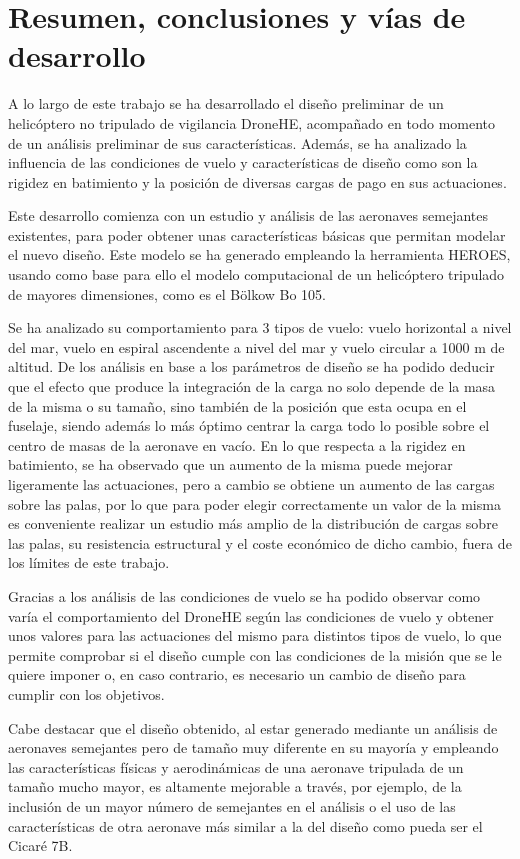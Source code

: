\chapter{Resumen, conclusiones y vías de desarrollo}

A lo largo de este trabajo se ha desarrollado el diseño preliminar de un helicóptero no tripulado de vigilancia DroneHE, acompañado en todo momento de un análisis preliminar de sus características. Además, se ha analizado la influencia de las condiciones de vuelo y características de diseño como son la rigidez en batimiento y la posición de diversas cargas de pago en sus actuaciones.

Este desarrollo comienza con un estudio y análisis de las aeronaves semejantes existentes, para poder obtener unas características básicas que permitan modelar el nuevo diseño. Este modelo se ha generado empleando la herramienta HEROES, usando como base para ello el modelo computacional de un helicóptero tripulado de mayores dimensiones, como es el Bölkow Bo 105.

Se ha analizado su comportamiento para 3 tipos de vuelo: vuelo horizontal a nivel del mar, vuelo en espiral ascendente a nivel del mar y vuelo circular a 1000 m de altitud. De los análisis en base a los parámetros de diseño se ha podido deducir que el efecto que produce la integración de la carga no solo depende de la masa de la misma o su tamaño, sino también de la posición que esta ocupa en el fuselaje, siendo además lo más óptimo centrar la carga todo lo posible sobre el centro de masas de la aeronave en vacío. En lo que respecta a la rigidez en batimiento, se ha observado que un aumento de la misma puede mejorar ligeramente las actuaciones, pero a cambio se obtiene un aumento de las cargas sobre las palas, por lo que para poder elegir correctamente un valor de la misma es conveniente realizar un estudio más amplio de la distribución de cargas sobre las palas, su resistencia estructural y el coste económico de dicho cambio, fuera de los límites de este trabajo.

Gracias a los análisis de las condiciones de vuelo se ha podido observar como varía el comportamiento del DroneHE según las condiciones de vuelo y obtener unos valores para las actuaciones del mismo para distintos tipos de vuelo, lo que permite comprobar si el diseño cumple con las condiciones de la misión que se le quiere imponer o, en caso contrario, es necesario un cambio de diseño para cumplir con los objetivos.

Cabe destacar que el diseño obtenido, al estar generado mediante un análisis de aeronaves semejantes pero de tamaño muy diferente en su mayoría y empleando las características físicas y aerodinámicas de una aeronave tripulada de un tamaño mucho mayor, es altamente mejorable a través, por ejemplo, de la inclusión de un mayor número de semejantes en el análisis o el uso de las características de otra aeronave más similar a la del diseño como pueda ser el Cicaré 7B.

